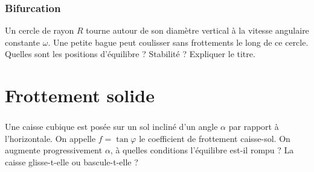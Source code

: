     \subsection{Bifurcation}
    
    Un cercle de rayon $R$ tourne autour de son diamètre vertical à la vitesse angulaire constante $\omega$. Une petite bague peut coulisser sans frottements le long de ce cercle. Quelles sont les positions d'équilibre ? Stabilité ? Expliquer le titre.
    
    
    \chapter{Frottement solide}
    
    \subsection{}
    
    Une caisse cubique est posée sur un sol incliné d'un angle $\alpha$ par rapport à l'horizontale. On appelle $f = \tan \varphi$ le coefficient de frottement caisse-sol. On augmente progressivement $\alpha$, à quelles conditions l'équilibre est-il rompu ? La caisse glisse-t-elle ou bascule-t-elle ?
    
    
    
    \subsection{}
    
